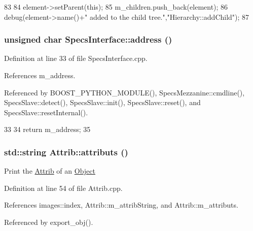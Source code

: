 \begin{DoxyCode}
83                                           {
84   element->setParent(this);
85   m_children.push_back(element);
86   debug(element->name()+" added to the child tree.","Hierarchy::addChild");
87 }
\end{DoxyCode}
\hypertarget{classSpecsInterface_a0fa039a15b842a5ba783ce825b9915d8}{
\subsubsection[{address}]{\setlength{\rightskip}{0pt plus 5cm}unsigned char SpecsInterface::address ()}}
\label{classSpecsInterface_a0fa039a15b842a5ba783ce825b9915d8}


Definition at line 33 of file SpecsInterface.cpp.

References m\_\-address.

Referenced by BOOST\_\-PYTHON\_\-MODULE(), SpecsMezzanine::cmdline(), SpecsSlave::detect(), SpecsSlave::init(), SpecsSlave::reset(), and SpecsSlave::resetInternal().


\begin{DoxyCode}
33                                       {
34     return m_address;
35 }
\end{DoxyCode}
\hypertarget{classAttrib_aee7bbf16b144887f196e1341b24f8a26}{
\subsubsection[{attributs}]{\setlength{\rightskip}{0pt plus 5cm}std::string Attrib::attributs ()}}
\label{classAttrib_aee7bbf16b144887f196e1341b24f8a26}
Print the \hyperlink{classAttrib}{Attrib} of an \hyperlink{classObject}{Object} 

Definition at line 54 of file Attrib.cpp.

References images::index, Attrib::m\_\-attribString, and Attrib::m\_\-attributs.

Referenced by export\_\-obj().


